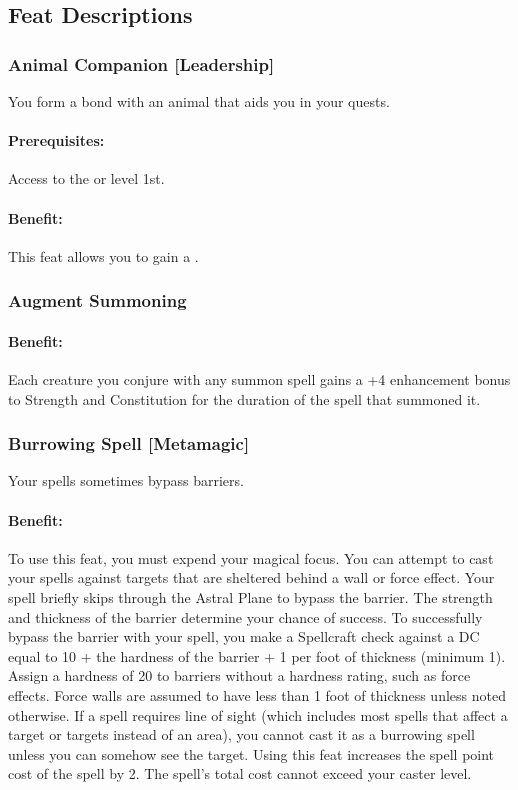 \subsection{Feat Descriptions}

\subsubsection[Animal Companion]{Animal Companion [Leadership]}
\label{Feat:AnimalCompanion}
You form a bond with an animal that aids you in your quests.

\paragraph{Prerequisites:} Access to the  or  level 1st.

\paragraph{Benefit:} This feat allows you to gain a .

\subsubsection{Augment Summoning}
\label{Feat:AugmentSummoning}
\paragraph{Benefit:}
Each creature you conjure with any summon spell gains a +4 enhancement bonus to Strength and Constitution for the duration of the spell that summoned it.

\subsubsection[Burrowing Spell]{Burrowing Spell [Metamagic]}
\label{Feat:BurrowingSpell}
Your spells sometimes bypass barriers.

\paragraph{Benefit:} To use this feat, you must expend your magical focus. 
You can attempt to cast your spells against targets that are sheltered behind a wall or force effect. 
Your spell briefly skips through the Astral Plane to bypass the barrier.
The strength and thickness of the barrier determine your chance of success. 
To successfully bypass the barrier with your spell, 
you make a Spellcraft check against a DC equal to 10 + the hardness of the barrier + 1 per foot of thickness (minimum 1). 
Assign a hardness of 20 to barriers without a hardness rating, such as force effects. 
Force walls are assumed to have less than 1 foot of thickness unless noted otherwise.
If a spell requires line of sight (which includes most spells that affect a target or targets instead of an area), 
you cannot cast it as a burrowing spell unless you can somehow see the target.%
Using this feat increases the spell point cost of the spell by 2. The spell's total cost cannot exceed your caster level.

